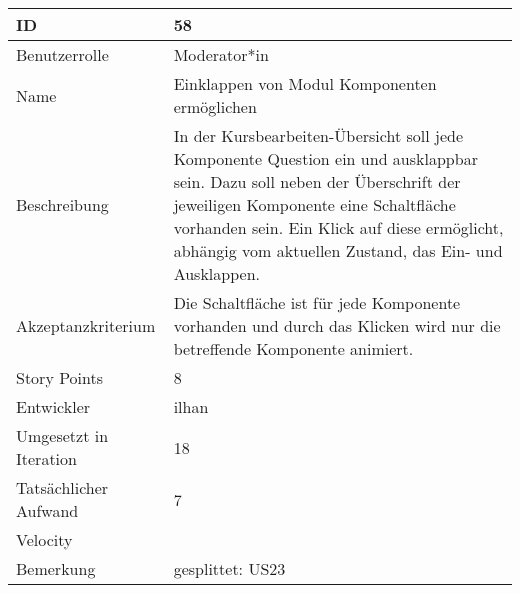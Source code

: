 \begin{tabularx}{\textwidth}{|p{}|X|}
	\hline
	ID & 58\\
	\hline
	Benutzerrolle & Moderator*in\\
	\hline
	Name & Einklappen von Modul Komponenten ermöglichen\\
	\hline
	Beschreibung & In der Kursbearbeiten-Übersicht soll jede Komponente Question ein und ausklappbar sein.
		Dazu soll neben der Überschrift der jeweiligen Komponente eine Schaltfläche vorhanden sein.
		Ein Klick auf diese ermöglicht, abhängig vom aktuellen Zustand, das Ein- und Ausklappen.\\
	\hline
	Akzeptanzkriterium & Die Schaltfläche ist für jede Komponente vorhanden und durch das Klicken wird nur die betreffende Komponente animiert.\\
	\hline
	Story Points & 8\\
	\hline
	Entwickler & ilhan\\
	\hline
	Umgesetzt in Iteration & 18\\ 
	\hline
	Tatsächlicher Aufwand & 7\\
	\hline
	Velocity & \\
	\hline
	Bemerkung & gesplittet: US23\\
	\hline
\end{tabularx}
\vspace{20pt}
